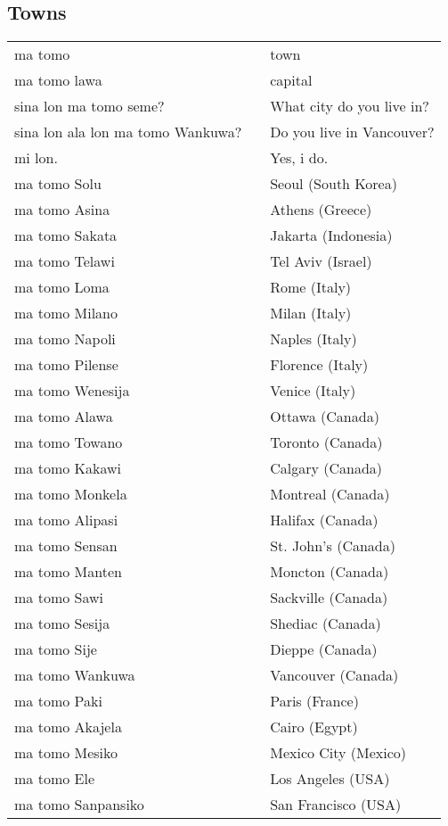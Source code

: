 \subsection{Towns}
%
\begin{supertabular}{p{4,5cm}|ll}
ma tomo && town \\
ma tomo lawa && capital \\
sina lon ma tomo seme? && What city do you live in? \\
sina lon ala lon ma tomo Wankuwa? && Do you live in Vancouver?  \\
 mi lon. &&  Yes, i do. \\
ma tomo Solu && Seoul (South Korea) \\
ma tomo Asina && Athens (Greece) \\
ma tomo Sakata && Jakarta (Indonesia) \\
ma tomo Telawi && Tel Aviv (Israel) \\
ma tomo Loma && Rome (Italy) \\
ma tomo Milano && Milan (Italy) \\
ma tomo Napoli && Naples (Italy) \\
ma tomo Pilense && Florence (Italy) \\
ma tomo Wenesija && Venice (Italy) \\
ma tomo Alawa && Ottawa (Canada) \\
ma tomo Towano && Toronto (Canada) \\
ma tomo Kakawi && Calgary (Canada) \\
ma tomo Monkela && Montreal (Canada) \\
ma tomo Alipasi && Halifax (Canada) \\
ma tomo Sensan && St. John's (Canada) \\
ma tomo Manten && Moncton (Canada) \\
ma tomo Sawi && Sackville (Canada) \\
ma tomo Sesija && Shediac (Canada) \\
ma tomo Sije && Dieppe (Canada) \\
ma tomo Wankuwa && Vancouver (Canada) \\
ma tomo Paki && Paris (France) \\
ma tomo Akajela && Cairo (Egypt) \\
ma tomo Mesiko && Mexico City (Mexico) \\
ma tomo Ele && Los Angeles (USA) \\
ma tomo Sanpansiko && San Francisco (USA) \\

\end{supertabular}

